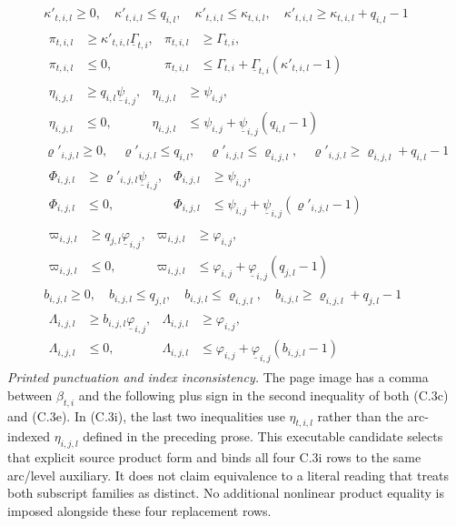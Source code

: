 \documentclass{article}
\begin{document}
\begin{align}
\begin{aligned}
\end{aligned}\tag{C.3f}\\
&\kappa'_{t,i,l}\geq0,\quad\kappa'_{t,i,l}\leq q_{i,l},\quad
\kappa'_{t,i,l}\leq\kappa_{t,i,l},\quad
\kappa'_{t,i,l}\geq\kappa_{t,i,l}+q_{i,l}-1
\tag{C.3g}\\
&\begin{aligned}
\pi_{t,i,l}&\geq\kappa'_{t,i,l}\underline\Gamma_{t,i},&\pi_{t,i,l}&\geq\Gamma_{t,i},\\
\pi_{t,i,l}&\leq0,&\pi_{t,i,l}&\leq\Gamma_{t,i}+\underline\Gamma_{t,i}(\kappa'_{t,i,l}-1)
\end{aligned}\tag{C.3h}\\
&\begin{aligned}
\eta_{i,j,l}&\geq q_{i,l}\underline\psi_{i,j},&\eta_{i,j,l}&\geq\psi_{i,j},\\
\eta_{i,j,l}&\leq0,&\eta_{i,j,l}&\leq\psi_{i,j}+\underline\psi_{i,j}(q_{i,l}-1)
\end{aligned}\tag{C.3i}\\
&\varrho'_{i,j,l}\geq0,\quad\varrho'_{i,j,l}\leq q_{i,l},\quad
\varrho'_{i,j,l}\leq\varrho_{i,j,l},\quad
\varrho'_{i,j,l}\geq\varrho_{i,j,l}+q_{i,l}-1
\tag{C.3j}\\
&\begin{aligned}
\Phi_{i,j,l}&\geq\varrho'_{i,j,l}\underline\psi_{i,j},&\Phi_{i,j,l}&\geq\psi_{i,j},\\
\Phi_{i,j,l}&\leq0,&\Phi_{i,j,l}&\leq\psi_{i,j}+\underline\psi_{i,j}(\varrho'_{i,j,l}-1)
\end{aligned}\tag{C.3k}\\
&\begin{aligned}
\varpi_{i,j,l}&\geq q_{j,l}\underline\varphi_{i,j},&\varpi_{i,j,l}&\geq\varphi_{i,j},\\
\varpi_{i,j,l}&\leq0,&\varpi_{i,j,l}&\leq\varphi_{i,j}+\underline\varphi_{i,j}(q_{j,l}-1)
\end{aligned}\tag{C.3l}\\
&b_{i,j,l}\geq0,\quad b_{i,j,l}\leq q_{j,l},\quad
 b_{i,j,l}\leq\varrho_{i,j,l},\quad b_{i,j,l}\geq\varrho_{i,j,l}+q_{j,l}-1
\tag{C.3m}\\
&\begin{aligned}
\Lambda_{i,j,l}&\geq b_{i,j,l}\underline\varphi_{i,j},&\Lambda_{i,j,l}&\geq\varphi_{i,j},\\
\Lambda_{i,j,l}&\leq0,&\Lambda_{i,j,l}&\leq\varphi_{i,j}+\underline\varphi_{i,j}(b_{i,j,l}-1)
\end{aligned}\tag{C.3n}
\end{align}
\noindent\emph{Printed punctuation and index inconsistency.} The page image has a comma
between $\beta_{t,i}$ and the following plus sign in the second inequality of both
(C.3c) and (C.3e). In (C.3i), the last two inequalities use $\eta_{t,i,l}$ rather than
the arc-indexed $\eta_{i,j,l}$ defined in the preceding prose. This executable candidate selects that explicit source product form and binds all four C.3i rows to the same arc/level auxiliary. It does not claim equivalence to a literal reading that treats both subscript families as distinct. No additional nonlinear product equality is imposed alongside these four replacement rows.
\end{document}
